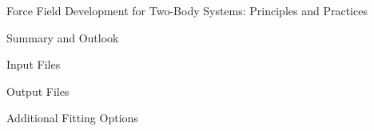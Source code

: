 \begin{chapter}{Force Field Development for Two-Body Systems: Principles and
Practices}
\begin{section}{Summary and Outlook}
\label{sec:pointer-conclusions}

\end{section}




\begin{subappendices}
\begin{section}{\pointer Input Files}

\end{section}
\begin{section}{\pointer Output Files}

\end{section}
\begin{section}{Additional Fitting Options}
\label{sec:pointer-advanced_options}

\end{section}
\end{subappendices}

\end{chapter}
